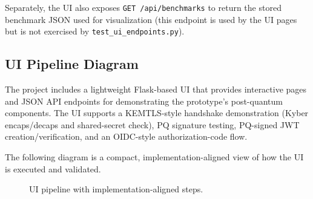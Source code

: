 \documentclass[conference]{IEEEtran}
\begin{document}
                \noindent Separately, the UI also exposes \texttt{GET /api/benchmarks} to return the stored benchmark JSON used for visualization (this endpoint is used by the UI pages but is not exercised by \texttt{test\_ui\_endpoints.py}).
                
                \subsection{UI Pipeline Diagram}
                The project includes a lightweight Flask-based UI that provides interactive pages and JSON API endpoints for demonstrating the prototype's post-quantum components. The UI supports a KEMTLS-style handshake demonstration (Kyber encaps/decaps and shared-secret check), PQ signature testing, PQ-signed JWT creation/verification, and an OIDC-style authorization-code flow.

                The following diagram is a compact, implementation-aligned view of how the UI is executed and validated.
                \begin{figure}[H]
                \centering
                \caption{UI pipeline with implementation-aligned steps.}
                \label{fig:ui-pipeline}
                \end{figure}
                
\end{document}
